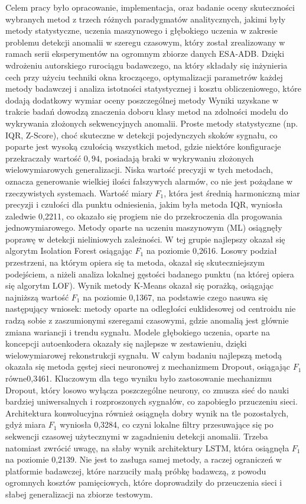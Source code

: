 \documentclass[a4paper,twoside,12pt]{book}
\begin{document}
	Celem pracy było opracowanie, implementacja, oraz badanie oceny skuteczności wybranych metod z trzech różnych paradygmatów analitycznych, jakimi były metody statystyczne, uczenia maszynowego i głębokiego uczenia w zakresie problemu detekcji anomalii w szeregu czasowym, który został zrealizowany w ramach serii eksperymentów na ogromnym zbiorze danych ESA-ADB. Dzięki wdrożeniu autorskiego rurociągu badawczego, na który składały się inżynieria cech przy użyciu techniki okna kroczącego, optymalizacji parametrów każdej metody badawczej i analiza istotności statystycznej i kosztu obliczeniowego, które dodają dodatkowy wymiar oceny poszczególnej metody
	Wyniki uzyskane w trakcie badań dowodzą znaczenia doboru klasy metod na zdolności modelu do wykrywania złożonych sekwencyjnych anomalii. Proste metody statystyczne  (np. IQR, Z-Score), choć skuteczne w detekcji pojedynczych skoków sygnału, co poparte jest wysoką czułością wszystkich metod, gdzie niektóre konfiguracje przekraczały wartość $0{,}94$, posiadają braki w wykrywaniu złożonych wielowymiarowych generalizacji. Niska wartość precyzji w tych metodach, oznacza generowanie wielkiej ilości fałszywych alarmów, co nie jest pożądane w rzeczywistych systemach. Wartość miary $F_1$, która jest średnią harmoniczną miar precyzji i czułości dla punktu odniesienia, jakim była metoda IQR, wyniosła zaledwie 0{,}2211, co okazało się progiem nie do przekroczenia dla progowania jednowymiarowego. Metody oparte na uczeniu maszynowym (ML) osiągnęły poprawę w detekcji nieliniowych zależności. W tej grupie najlepszy okazał się algorytm Isolation Forest osiągając $F_1$ na poziomie 0{,}2616. Losowy podział przestrzeni, na którym opiera się ta metoda, okazał się skuteczniejszym podejściem, a niżeli analiza lokalnej gęstości badanego punktu (na której opiera się algorytm LOF). Wynik metody K-Means okazał się porażką, osiągając najniższą wartość $F_1$ na poziomie 0{,}1367, na podstawie czego nasuwa się następujący wniosek: metody oparte na odległości euklidesowej od centroidu nie radzą sobie z zaszumionymi szeregami czasowymi, gdzie anomalią jest głównie zmiana wariancji i trendu sygnału. Modele głębokiego uczenia, oparte na koncepcji autoenkodera okazały się najlepsze w zestawieniu, dzięki wielowymiarowej rekonstrukcji sygnału. W całym badaniu najlepszą metodą okazała się metoda gęstej sieci neuronowej z mechanizmem Dropout, osiągając $F_1$ równe0{,}3461. Kluczowym dla tego wyniku było zastosowanie mechanizmu Dropout, który losowo wyłącza poszczególne neurony, co zmusza sieć do nauki bardziej uniwersalnych i rozproszonych sygnałów, co zapobiegło przuczeniu sieci. Architektura konwolucyjna również osiągnęła dobry wynik na tle pozostałych, gdyż miara $F_1$ wyniosła 0{,}3284, co czyni lokalne filtry przesuwające się po sekwencji czasowej użytecznymi w zagadnieniu detekcji anomalii. Trzeba natomiast zwrócić uwagę, na słaby wynik architektury LSTM, która osiągnęła $F_1$ na poziomie 0{,}2139. Nie jest to zasługa samej metody, a raczej ograniczeń w platformie badawczej, które narzuciły małą próbkę badawczą, z powodu ogromnych kosztów pamięciowych, które doprowadziły do przeuczenia sieci i słabej generalizacji na zbiorze testowym. 
	
\end{document}
